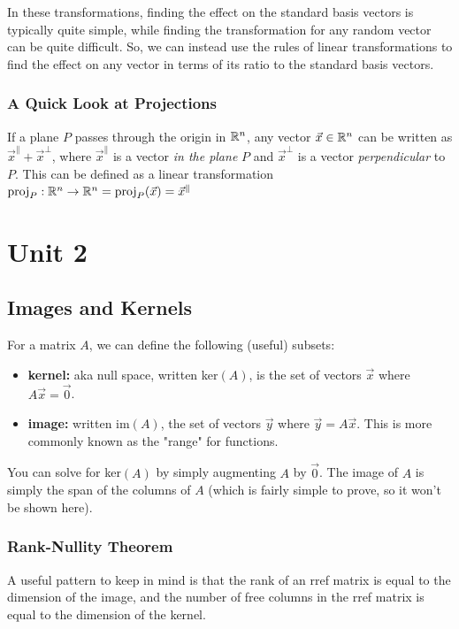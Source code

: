 \documentclass[12pt]{article}
\begin{document}
In these transformations, finding the effect on the standard basis vectors is typically quite simple, while finding the transformation for any random vector can be quite difficult. So, we can instead use the rules of linear transformations to find the effect on any vector in terms of its ratio to the standard basis vectors.

\subsubsection{A Quick Look at Projections}

If a plane $P$ passes through the origin in $\mathbb{R}^n$, any vector $\Vec{x} \in \mathbb{R}^n$ can be written as $\Vec{x}^{\parallel} + \Vec{x}^{\perp}$, where $\Vec{x}^{\parallel}$ is a vector \textit{in the plane} $P$ and $\Vec{x}^{\perp}$ is a vector \textit{perpendicular} to $P$. This can be defined as a linear transformation $\text{proj}_P:\mathbb{R}^n \to \mathbb{R}^n = \text{proj}_P(\Vec{x}) = \Vec{x}^{\parallel}$

\section{Unit 2}
\subsection{Images and Kernels}

For a matrix $A$, we can define the following (useful) subsets:

\begin{itemize}
    \item \textbf{kernel:} aka null space, written ker$(A)$, is the set of vectors $\Vec{x}$ where $A\Vec{x} = \Vec{0}$.
    
    \item \textbf{image:} written im$(A)$, the set of vectors $\Vec{y}$ where $\Vec{y} = A\Vec{x}$. This is more commonly known as the "range" for functions.
\end{itemize}

You can solve for ker$(A)$ by simply augmenting $A$ by $\Vec{0}$. The image of $A$ is simply the span of the columns of $A$ (which is fairly simple to prove, so it won't be shown here).

\subsubsection{Rank-Nullity Theorem}

A useful pattern to keep in mind is that the rank of an rref matrix is equal to the dimension of the image, and the number of free columns in the rref matrix is equal to the dimension of the kernel.
\end{document}
